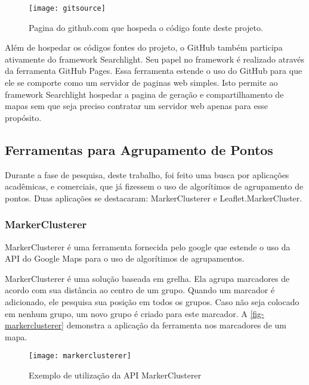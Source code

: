 	\begin{figure}[htb]
	\caption{\label{fig-gitsource}Pagina do github.com que hospeda o código fonte deste projeto.}
	\begin{center}
	    \texttt{[image: gitsource]}
	\end{center}
\end{figure}

Além de hospedar os códigos fontes do projeto, o GitHub também participa ativamente do framework Searchlight. Seu papel no framework é realizado através da ferramenta GitHub Pages. Essa ferramenta estende o uso do GitHub para que ele se comporte como um servidor de paginas web simples. Isto permite ao framework Searchlight hospedar a pagina de geração e compartilhamento de mapas sem que seja preciso contratar um servidor web apenas para esse propósito.


\subsection{Ferramentas para Agrupamento de Pontos}
		Durante a fase de pesquisa, deste trabalho, foi feito uma busca por aplicações acadêmicas, e comerciais, que já fizessem o uso de algorítimos de agrupamento de pontos. Duas aplicações se destacaram: MarkerClusterer e Leaflet.MarkerCluster.
		
		
		\subsubsection{MarkerClusterer}		
		MarkerClusterer \cite[188]{livroGoogleApiV3} é uma ferramenta fornecida pelo google que estende o uso da API do Google Maps para o uso de algorítimos de agrupamentos.
		
		MarkerClusterer é uma solução baseada em grelha. Ela agrupa marcadores de acordo com sua distância ao centro de um grupo. Quando um marcador é adicionado, ele pesquisa sua posição em todos os grupos. Caso não seja colocado em nenhum grupo, um novo grupo é criado para este marcador. A \autoref{fig-markerclusterer} demonstra a aplicação da ferramenta nos marcadores de um mapa.
	\begin{figure}[htb]
	\caption{\label{fig-markerclusterer}Exemplo de utilização da API MarkerClusterer }
	\begin{center}
	    \texttt{[image: markerclusterer]}
	\end{center}
\end{figure}

